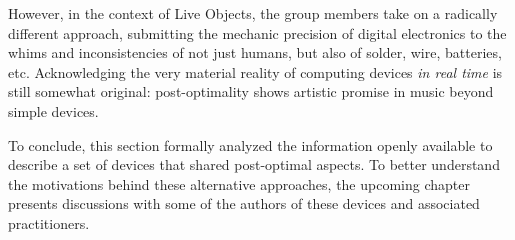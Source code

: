 However, in the context of Live Objects, the group members take on a radically different approach, submitting the mechanic precision of digital electronics to the whims and inconsistencies of not just humans, but also of solder, wire, batteries, etc. Acknowledging the very material reality of computing devices \emph{in real time} is still somewhat original: post-optimality shows artistic promise in music beyond simple devices. 

To conclude, this section formally analyzed the information openly available to describe a set of devices that shared post-optimal aspects. To better understand the motivations behind these alternative approaches, the upcoming chapter presents discussions with some of the authors of these devices and associated practitioners. 

